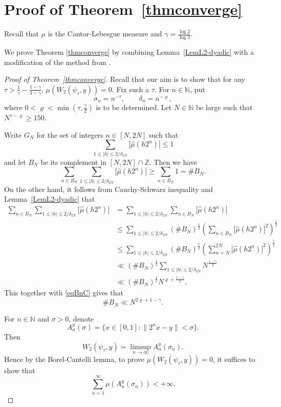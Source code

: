 \documentclass[amssymb,amsfonts,refcheck,12pt,verbatim,righttag]{amsart}
\numberwithin{equation}{section} %
\theoremstyle{plain}
\begin{document}
\section{Proof of Theorem~\ref{thmconverge}}\label{sec:thmconverge}


Recall that $\mu$  is the Cantor-Lebesgue measure and $\gamma=\frac{\log 2}{\log 3}$. 

We prove Theorem \ref{thmconverge} by combining Lemma~\ref{LemL2-dyadic} with a modification of the method from \cite[Theorem 2]{ABCY23A}.
\begin{proof}[Proof of Theorem~\ref{thmconverge}]
Recall that our aim is to show that for any  $\tau>\frac{1}{\gamma}-\frac{1-\gamma}{3-\gamma}$, \(\mu (W_{2}(\psi_{\tau},y))= 0\). Fix such a  $\tau$. For \(n\in  \mathbb{N}\), put
	\[
	\sigma_{n} = n^{-\tau},\qquad \delta_{n} = n^{-\varrho},
	\]
	where $0<\varrho<\min(\tau,\frac{\gamma}{2})$ is to be determined. Let \(N\in \mathbb{N}\) be large such that $N^{\tau-\varrho}\geq150$. 
	
	
	Write \(G_{N}\) for the set of integers \(n\in [N,2N]\) such that
	\[
	\sum_{1\leq |h|\leq 2/\delta_{2N}}|\widehat{\mu} (h2^{n})|\leq1
	\]
	and let \(B_{N}\) be its complement in \([N,2N]\cap \mathbb{Z}\). Then we have \begin{equation}\label{eqBnC}
		\sum_{n\in B_{N}}\sum_{1\leq |h|\leq 2/\delta_{2N}}|\widehat{\mu} (h2^{n})|\geq\sum_{n\in B_{N}}1=\#B_{N}.
	\end{equation}
On the other hand, it follows from Cauchy-Schwarz inequality and Lemma~\ref{LemL2-dyadic} that
	\begin{align*}
		\sum_{n\in B_{N}}\sum_{1\leq |h|\leq 2/\delta_{2N}}|\widehat{\mu} (h2^{n})|&=\sum_{1\leq |h|\leq 2/\delta_{2N}}\sum_{n\in B_{N}}|\widehat{\mu}(h2^{n})|\\
        &\leq\sum_{1\leq |h|\leq 2/\delta_{2N}}(\#B_{N})^{\frac{1}{2}}\left(\sum_{n\in B_{N}}|\widehat{\mu}(h2^{n})|^{2}\right)^{\frac{1}{2}} \\
		&\leq\sum_{1\leq |h|\leq 2/\delta_{2N}}(\#B_{N})^{\frac{1}{2}}\left(\sum_{n=N}^{2N}|\widehat{\mu}(h2^{n})|^{2}\right)^{\frac{1}{2}} \\
&\ll(\#B_{N})^{\frac{1}{2}}\sum_{1\leq |h|\leq 2/\delta_{2N}}N^{\frac{1-\gamma}{2}} \\ &\ll(\#B_{N})^{\frac{1}{2}}N^{\varrho+\frac{1-\gamma}{2}}.
	\end{align*}
	This together with \eqref{eqBnC} gives that
	$$ \#B_{N}\ll N^{2\varrho+1-\gamma}.$$

	
For \(n\in \mathbb{N}\) and \(\sigma >0\), denote
	\[
	A_{n}^{y}(\sigma) = \{x\in [0,1]:\| 2^{n}x - y\| < \sigma\}.
	\]
Then 
	\[
	W_{2}(\psi_{\tau},y) = \limsup_{n\to\infty} A_{n}^{y}(\sigma_{n}).
	\]
Hence by the Borel-Cantelli lemma, to prove \(\mu (W_{2}(\psi_{\tau},y))= 0\), it suffices to show that
	\[
	\sum_{n = 1}^{\infty}\mu (A_{n}^{y}(\sigma_{n}))<+\infty.
	\]
	

\end{proof}
\end{document}
